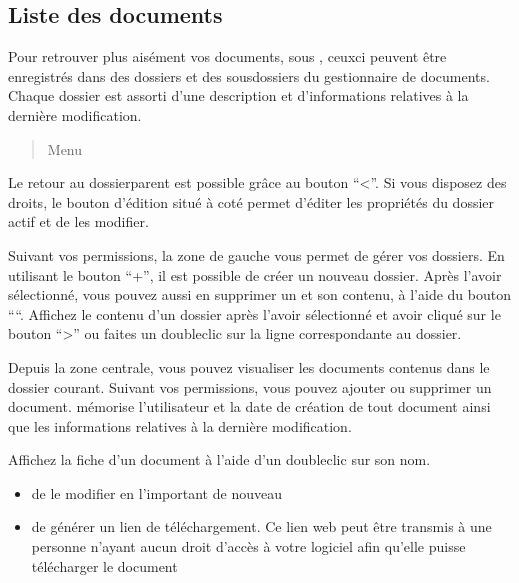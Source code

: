 \documentclass[letterpaper,10pt,french]{sphinxmanual}
\begin{document}
\subsection{Liste des documents}
\label{\detokenize{documents/shared_document:liste-des-documents}}
\sphinxAtStartPar
Pour retrouver plus aisément vos documents, sous , ceux\sphinxhyphen{}ci peuvent être enregistrés dans des dossiers et des sous\sphinxhyphen{}dossiers du gestionnaire de documents.
Chaque dossier est assorti d’une description et d’informations relatives à la dernière modification.
\begin{quote}

\sphinxAtStartPar
Menu 
\end{quote}

\sphinxAtStartPar
Le retour au dossier\sphinxhyphen{}parent est possible grâce au bouton “\textless{}”.
Si vous disposez des droits, le bouton d’édition situé à coté permet d’éditer les propriétés du dossier actif et de les modifier.

\noindent{}

\sphinxAtStartPar
Suivant vos permissions, la zone de gauche vous permet de gérer vos dossiers.
En utilisant le bouton “+”, il est possible de créer un nouveau dossier.
Après l’avoir sélectionné, vous pouvez aussi en supprimer un et son contenu, à l’aide du bouton “\sphinxhyphen{}“.
Affichez le contenu d’un dossier après l’avoir sélectionné et avoir cliqué sur le bouton “\textgreater{}” ou faites un double\sphinxhyphen{}clic sur la ligne correspondante au dossier.

\sphinxAtStartPar
Depuis la zone centrale, vous pouvez visualiser les documents contenus dans le dossier courant.
Suivant vos permissions, vous pouvez ajouter ou supprimer un document.
 mémorise l’utilisateur et la date de création de tout document ainsi que les informations relatives à la dernière modification.

\sphinxAtStartPar
Affichez la fiche d’un document à l’aide d’un double\sphinxhyphen{}clic sur son nom.

\noindent{}
\begin{description}
\begin{itemize}
\item {} 
\sphinxAtStartPar
de le modifier en l’important de nouveau

\item {} 
\sphinxAtStartPar
de générer un lien de téléchargement. Ce lien web peut être transmis à une personne n’ayant aucun droit d’accès à votre logiciel afin qu’elle puisse télécharger le document

\end{itemize}

\end{description}
\end{document}
